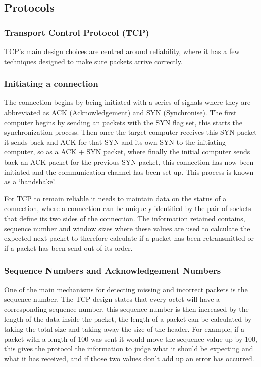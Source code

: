 
\subsection{Protocols}
\subsubsection{Transport Control Protocol (TCP)}
TCP's main design choices are centred around reliability, where it has a few techniques designed to make sure packets arrive correctly. 

\subsubsection{Initiating a connection}
The connection begins by being initiated with a series of signals where they are abbreviated as ACK (Acknowledgement) and SYN (Synchronise). The first computer begins by sending an packets with the SYN flag set, this starts the synchronization process. Then once the target computer receives this SYN packet it sends back and ACK for that SYN and its own SYN to the initiating computer, so as a ACK + SYN packet, where finally the initial computer sends back an ACK packet for the previous SYN packet, this connection has now been initiated and the communication channel has been set up. This process is known as a `handshake'.

For TCP to remain reliable it needs to maintain data on the status of a connection, where a connection can be uniquely identified by the pair of sockets that define its two sides of the connection. The information retained contains, sequence number and window sizes where these values are used to calculate the expected next packet to therefore calculate if a packet has been retransmitted or if a packet has been send out of its order.


\subsubsection{Sequence Numbers and Acknowledgement Numbers}
One of the main mechanisms for detecting missing and incorrect packets is the sequence number. The TCP design states that every octet will have a corresponding sequence number, this sequence number is then increased by the length of the data inside the packet, the length of a packet can be calculated by taking the total size and taking away the size of the header. For example, if a packet with a length of 100 was sent it would move the sequence value up by 100, this gives the protocol the information to judge what it should be expecting and what it has received, and if those two values don't add up an error has occurred. 

